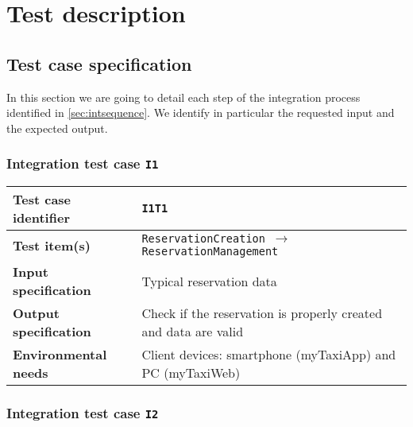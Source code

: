 \chapter{Test description}\label{chap:steps}


\section{Test case specification}

In this section we are going to detail each step of the integration process identified in \cref{sec:intsequence}. We identify in particular the requested input and the expected output.

\subsection{Integration test case \normalfont\texttt{I1}}\label{subsec:t1}

\begin{table*}[!h]\centering\begin{tabularx}{.9\textwidth}{ >{\bfseries}l X }\toprule%
Test case identifier	&	\texttt{I1T1}	\\\midrule
Test item(s)		&	\texttt{ReservationCreation $\to$ ReservationManagement}	\\\midrule
Input specification	&	Typical reservation data	\\\midrule
Output specification	&	Check if the reservation is properly created and data are valid	\\\midrule
Environmental needs	&	Client devices: smartphone (myTaxiApp) and PC (myTaxiWeb)	\\
\bottomrule\end{tabularx}\end{table*}






\subsection{Integration test case \normalfont\texttt{I2}}\label{subsec:t2}

